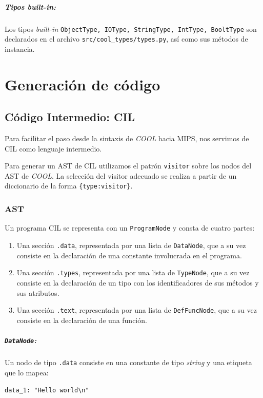 \documentclass[a4paper,10pt,twocolumn]{article}
\begin{document}
\subparagraph{Tipos \textit{built-in}:}

Los tipos \textit{built-in} \lstinline|ObjectType, IOType, StringType, IntType, BooltType| son declarados en el archivo \lstinline|src/cool_types/types.py|, así como sus métodos de instancia.

\section{Generación de código}

\subsection{Código Intermedio: CIL}
Para facilitar el paso desde la sintaxis de \textit{COOL} hacia MIPS, nos servimos de CIL como lenguaje intermedio. 

Para generar un AST de CIL utilizamos el patrón \lstinline|visitor| sobre los nodos del AST de \textit{COOL}. La selección del visitor adecuado se realiza a partir de un diccionario de la forma \lstinline|{type:visitor}|.

\subsubsection{AST}

Un programa CIL se representa con un \lstinline|ProgramNode| y consta de cuatro partes:

\begin{enumerate}
	\item Una sección \lstinline|.data|, representada por una lista de \lstinline|DataNode|, que a su vez consiste en la declaración de una constante involucrada en el programa. 
	\item Una sección \lstinline|.types|, representada por una lista de \lstinline|TypeNode|, que a su vez consiste en la declaración de un tipo con los identificadores de sus métodos y sus atributos. 
	\item Una sección \lstinline|.text|, representada por una lista de \lstinline|DefFuncNode|, que a su vez consiste en la declaración de una función.
\end{enumerate}

\subparagraph{\lstinline|DataNode|:}

Un nodo de tipo \lstinline|.data| consiste en una constante de tipo \textit{string} y una etiqueta que lo mapea:

\begin{center}
	\lstinline|data_1: "Hello world\n"|
\end{center}
\end{document}
